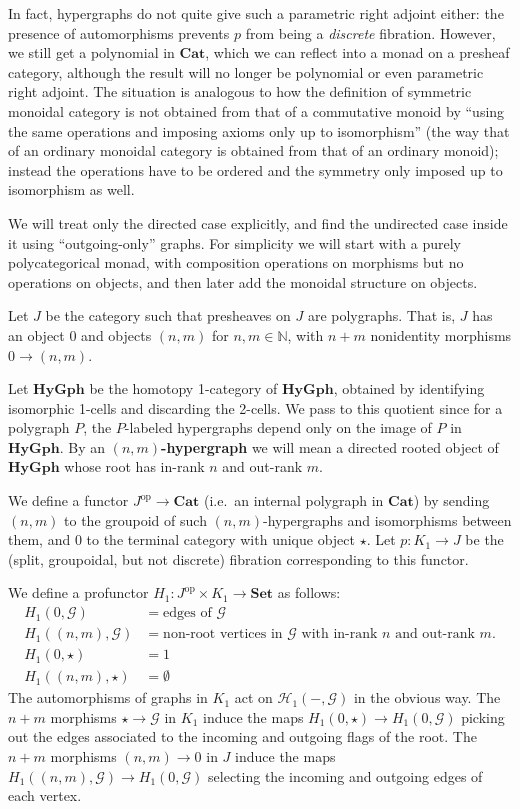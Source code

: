 \documentclass{article}
\theoremstyle{definition}
\theoremstyle{remark}
\def\G{\mathcal{G}}
\def\H{\mathcal{H}}
\def\Set{\mathbf{Set}}
\def\Cat{\ensuremath{\mathbf{Cat}}}
\def\op{^{\mathrm{op}}}
\def\N{\mathbb{N}}
\def\hy{\mathbf{HyGph}}
\def\hohy{\mathbf{HyGph}}
\begin{document}
In fact, hypergraphs do not quite give such a parametric right adjoint either: the presence of automorphisms prevents $p$ from being a \emph{discrete} fibration.
However, we still get a polynomial in \Cat, which we can reflect into a monad on a presheaf category, although the result will no longer be polynomial or even parametric right adjoint.
The situation is analogous to how the definition of symmetric monoidal category is not obtained from that of a commutative monoid by ``using the same operations and imposing axioms only up to isomorphism'' (the way that of an ordinary monoidal category is obtained from that of an ordinary monoid); instead the operations have to be ordered and the symmetry only imposed up to isomorphism as well.

We will treat only the directed case explicitly, and find the undirected case inside it using ``outgoing-only'' graphs.
For simplicity we will start with a purely polycategorical monad, with composition operations on morphisms but no operations on objects, and then later add the monoidal structure on objects.

Let $J$ be the category such that presheaves on $J$ are polygraphs.
That is, $J$ has an object $0$ and objects $(n,m)$ for $n,m\in\N$, with $n+m$ nonidentity morphisms $0\to (n,m)$.

Let $\hohy$ be the homotopy 1-category of $\hy$, obtained by identifying isomorphic 1-cells and discarding the 2-cells.
We pass to this quotient since for a polygraph $P$, the $P$-labeled hypergraphs depend only on the image of $P$ in $\hohy$.
By an \textbf{$(n,m)$-hypergraph} we will mean a directed rooted object of $\hohy$ whose root has in-rank $n$ and out-rank $m$.

We define a functor $J\op\to\Cat$ (i.e.\ an internal polygraph in $\Cat$) by sending $(n,m)$ to the groupoid of such $(n,m)$-hypergraphs and isomorphisms between them, and $0$ to the terminal category with unique object $\star$.
Let $p:K_1 \to J$ be the (split, groupoidal, but not discrete) fibration corresponding to this functor.

We define a profunctor $H_1 : J\op\times K_1 \to \Set$ as follows:
\begin{align*}
  H_1(0,\G) &= \text{edges of $\G$}\\
  H_1((n,m),\G) &= \text{non-root vertices in $\G$ with in-rank $n$ and out-rank $m$}.\\
  H_1(0,\star) &= 1\\
  H_1((n,m),\star) &= \emptyset
\end{align*}
The automorphisms of graphs in $K_1$ act on $\H_1(-,\G)$ in the obvious way.
The $n+m$ morphisms $\star\to\G$ in $K_1$ induce the maps $H_1(0,\star) \to H_1(0,\G)$ picking out the edges associated to the incoming and outgoing flags of the root.
The $n+m$ morphisms $(n,m)\to 0$ in $J$ induce the maps $H_1((n,m),\G) \to H_1 (0,\G)$ selecting the incoming and outgoing edges of each vertex.
\end{document}
